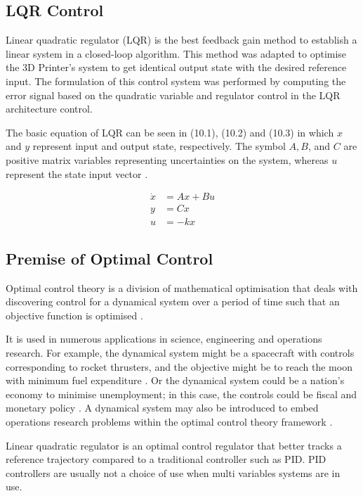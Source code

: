 \documentclass{UoNMCHA}
\numberwithin{equation}{section}
\begin{document}
	
	\subsection{LQR Control}
	
	Linear quadratic regulator (LQR) is the best feedback gain method to establish a linear system in a closed-loop algorithm. This method was adapted to optimise the 3D Printer's system to get identical output state with the desired reference input. The formulation of this control system was performed by computing the error signal based on the quadratic variable and regulator control in the LQR architecture control. 
	
	\newpage
	The basic equation of LQR can be seen in (10.1), (10.2) and (10.3) in which $ x $ and $ y $ represent input and output state, respectively. The symbol $ A,B $, and $ C $ are positive matrix variables representing uncertainties on the system, whereas $ u $ represent the state input vector \cite{kuantama_2018_feedback}.
	
	\begin{align}
	\dot{x} &= Ax + Bu \\
	 y&=Cx \\
	  u&=-kx
	\end{align}
	
	\subsection*{Premise of Optimal Control}
	
	Optimal control theory is a division of mathematical optimisation that deals with discovering control for a dynamical system over a period of time such that an objective function is optimised \cite{imichaelross_2015_a}. \par
	
	It is used in numerous applications in science, engineering and operations research. For example, the dynamical system might be a spacecraft with controls corresponding to rocket thrusters, and the objective might be to reach the moon with minimum fuel expenditure \cite{luenberger_1979_introduction}. Or the dynamical system could be a nation's economy to minimise unemployment; in this case, the controls could be fiscal and monetary policy \cite{kamien_2012_dynamic}. A dynamical system may also be introduced to embed operations research problems within the optimal control theory framework \cite{ross_2016_a}. \par
	
	Linear quadratic regulator is an optimal control regulator that better tracks a reference trajectory compared to a traditional controller such as PID. PID controllers are usually not a choice of use when multi variables systems are in use. 
	
\end{document}
